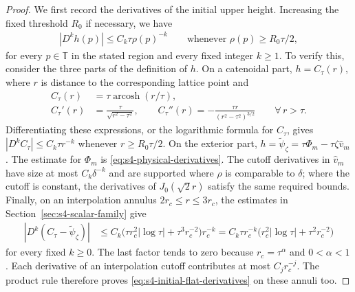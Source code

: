 \documentclass[a4paper,11pt,oneside,reqno]{amsart}
\numberwithin{equation}{section}
\theoremstyle{definition}
\begin{document}
\begin{proof}
    We first record the derivatives of the initial upper
    height. Increasing the fixed threshold $R_0$ if necessary,
    we have
    \begin{align}
        \label{eq:s4-initial-flat-derivatives}
        |D^kh(p)|\leq C_k\tau\rho(p)^{-k}
        \qquad\text{whenever }\rho(p)\geq R_0\tau/2,
    \end{align}
    for every $p\in\mathbb T$ in the stated region and every
    fixed integer $k\geq1$. To verify this, consider
    the three parts of the definition of $h$.
    On a catenoidal part, $h=C_\tau(r)$, where
    $r$ is distance to the corresponding lattice point and
    \begin{align*}
        C_\tau(r)&=\tau\operatorname{arcosh}(r/\tau),\\
        C_\tau'(r)&=\frac{\tau}{\sqrt{r^2-\tau^2}},\qquad
        C_\tau''(r)=-\frac{\tau r}{(r^2-\tau^2)^{3/2}}
        \qquad\forall\,r>\tau.
    \end{align*}
    Differentiating these expressions, or the logarithmic
    formula for $C_\tau$, gives
    $|D^kC_\tau|\leq C_k\tau r^{-k}$ whenever
    $r\geq R_0\tau/2$.
    On the exterior part,
    $h=\widetilde\psi_\zeta
       =\tau\Phi_m-\tau\zeta\widehat v_m$.
    The estimate for $\Phi_m$ is
    \eqref{eq:s4-physical-derivatives}. The cutoff derivatives
    in $\widehat v_m$ have size at most $C_k\delta^{-k}$
    and are supported where $\rho$ is comparable to $\delta$;
    where the cutoff is constant, the derivatives of
    $J_0(\sqrt2r)$ satisfy the same required bounds.
    Finally, on an interpolation annulus
    $2r_c\leq r\leq3r_c$, the estimates in
    Section~\ref{sec:s4-scalar-family} give
    \begin{align*}
        |D^k(C_\tau-\widetilde\psi_\zeta)|
        &\leq C_k\bigl(\tau r_c^2|\log\tau|
                         +\tau^3r_c^{-2}\bigr)r_c^{-k}=C_k\tau r_c^{-k}
              \bigl(r_c^2|\log\tau|+\tau^2r_c^{-2}\bigr)
    \end{align*}
    for every fixed $k\geq0$.
    The last factor tends to zero because $r_c=\tau^\alpha$
    and $0<\alpha<1$. Each derivative of an interpolation
    cutoff contributes at most $C_jr_c^{-j}$. The product
    rule therefore proves
    \eqref{eq:s4-initial-flat-derivatives} on these annuli too.


\end{proof}
\end{document}

